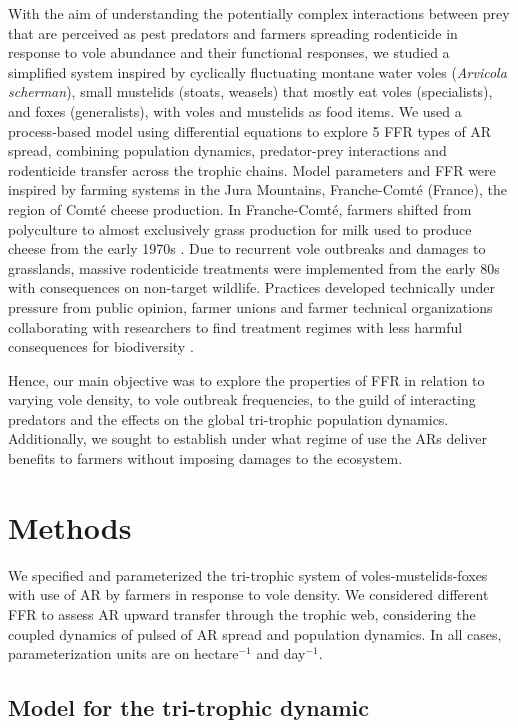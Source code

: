 \documentclass[11pt]{article}
\begin{document}
With the aim of understanding the potentially complex interactions between prey that are perceived as pest predators and farmers spreading rodenticide in response to vole abundance and their functional responses, we studied a simplified system inspired by cyclically fluctuating montane water voles (\textit{Arvicola scherman}), small mustelids (stoats, weasels) that mostly eat voles (specialists), and foxes (generalists), with voles and mustelids as food items. We used a process-based model using differential equations to explore 5 FFR types of AR spread, combining population dynamics, predator-prey interactions and rodenticide transfer across the trophic chains. Model parameters and FFR were inspired by farming systems in the Jura Mountains, Franche-Comté (France), the region of Comté cheese production. In Franche-Comté, farmers shifted from polyculture to almost exclusively grass production for milk used to produce cheese from the early 1970s \citep{Giraudoux1997}. Due to recurrent vole outbreaks and damages to grasslands, massive rodenticide treatments were implemented from the early 80s with consequences on non-target wildlife. Practices developed technically under pressure from public opinion, farmer unions and farmer technical organizations collaborating with researchers to find treatment regimes with less harmful consequences for biodiversity \citep{Delattre2009}. 

Hence, our main objective was to explore the properties of FFR in relation to varying vole density, to vole outbreak frequencies, to the guild of interacting predators and the effects on the global tri-trophic population dynamics. Additionally, we sought to establish under what regime of use the ARs deliver benefits to farmers without imposing damages to the ecosystem. 

\section{Methods}

We specified and parameterized the tri-trophic system of voles-mustelids-foxes with use of AR by farmers in response to vole density. We considered different FFR to assess AR upward transfer through the trophic web, considering the coupled dynamics of pulsed of AR spread and population dynamics. In all cases, parameterization units are on hectare$^{-1}$ and day$^{-1}$.

\subsection{Model for the tri-trophic dynamic}
\end{document}
